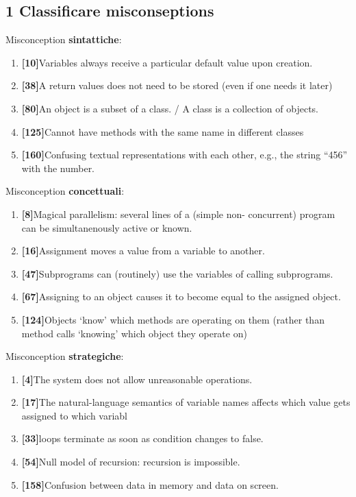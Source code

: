 \documentclass[a4paper]{article}
\begin{document}
\subsection{1 Classificare misconseptions}
Misconception \textbf{sintattiche}:
\begin{enumerate}
	\item \textbf{[10]}Variables always receive a particular default value upon creation.
	\item \textbf{[38]}A return values does not need to be stored (even if one needs it later)
	\item \textbf{[80]}An object is a subset of a class. / A class is a collection of objects.
	\item \textbf{[125]}Cannot have methods with the same name in different classes
	\item \textbf{[160]}Confusing textual representations with each other, e.g., the string “456” with the number.
	
\end{enumerate}
Misconception \textbf{concettuali}:
\begin{enumerate}
	\item \textbf{[8]}Magical parallelism: several lines of a (simple non- concurrent) program can be simultanenously active or known.
	\item \textbf{[16]}Assignment moves a value from a variable to another.
	\item \textbf{[47]}Subprograms can (routinely) use the variables of calling subprograms.
	\item \textbf{[67]}Assigning to an object causes it to become equal to the assigned object.
	\item \textbf{[124]}Objects ‘know’ which methods are operating on them (rather than method calls ‘knowing’ which object they operate on)
\end{enumerate}
Misconception \textbf{strategiche}:
\begin{enumerate}
	\item \textbf{[4]}The system does not allow unreasonable operations.
	\item \textbf{[17]}The natural-language semantics of variable names affects which value gets assigned to which variabl
	\item \textbf{[33]}loops terminate as soon as condition changes to false.
	\item \textbf{[54]}Null model of recursion: recursion is impossible.
	\item \textbf{[158]}Confusion between data in memory and data on screen.
\end{enumerate}
\end{document}
